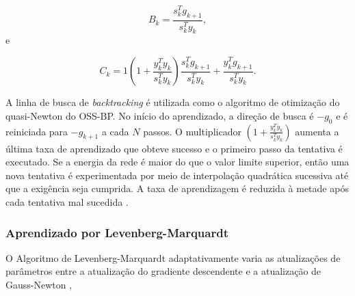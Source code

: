 \begin{equation}
\label{eq:oss2}
B_k = \frac{s^T_k g_{k+1}}{s^T_k y_k}, 
\end{equation}
e

\begin{equation}
\label{eq:oss3}
C_k = 1 \left(1 + \frac{y^T_k y_k}{s^T_k y_k} \right)  \frac{s^T_k g_{k+1}}{s^T_k y_k} + \frac{y^T_k g_{k+1}}{s^T_k y_k} .
\end{equation}

A linha de busca de \textit{backtracking} é utilizada como o algoritmo de otimização do quasi-Newton do OSS-BP. No início do aprendizado, a direção de busca é $-g_0$ e é reiniciada para $-g_{k+1}$ a cada $N$ passos. O multiplicador $\left(1 + \frac{y^T_k y_k}{s^T_k y_k} \right)$ aumenta a última taxa de aprendizado que obteve sucesso e o primeiro passo da tentativa é executado.  Se a energia da rede é maior do que o valor limite superior, então uma nova tentativa é experimentada por meio de interpolação quadrática sucessiva até que a exigência seja cumprida. A taxa de aprendizagem é reduzida à metade após cada tentativa mal sucedida \cite{saini2002artificial}.

\subsubsection{Aprendizado por Levenberg-Marquardt}

O Algoritmo de Levenberg-Marquardt adaptativamente varia as atualizações de parâmetros entre a atualização do gradiente descendente e a atualização de Gauss-Newton \label{symbol:funcaoerroLM} \cite{marquardt1963algorithm},

